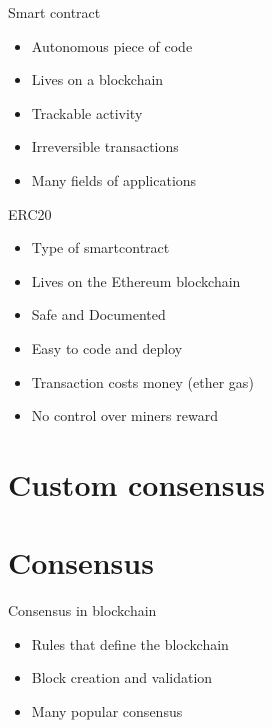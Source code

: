\documentclass[12pt]{beamer}
\begin{document}
  \begin{frame}{Smart contract}
    \begin{itemize}
      \item \alert{Autonomous} piece of code
      \pause
      \item Lives on a \alert{blockchain}
      \pause
      \item \alert{Trackable} activity
      \pause
      \item \alert{Irreversible} transactions
      \pause
      \item Many fields of applications
    \end{itemize}
  \end{frame}

  \begin{frame}{ERC20}
    \begin{itemize}
      \item Type of \alert{smartcontract}
      \item Lives on the \alert{Ethereum} blockchain
    \end{itemize}
      \pause
    \begin{itemize}
      \item Safe and Documented
      \item Easy to code and deploy
    \end{itemize}
      \pause
    \begin{itemize}
      \item Transaction costs money (ether gas)
      \item No control over miners reward
    \end{itemize}
  \end{frame}



  \section{Custom consensus}


  \section{Consensus}

  \begin{frame}{Consensus in blockchain}
    \begin{itemize}
      \item Rules that define the blockchain
      \pause
      \item Block creation and validation
      \pause
      \item Many popular consensus
    \end{itemize}
  \end{frame}
\end{document}
